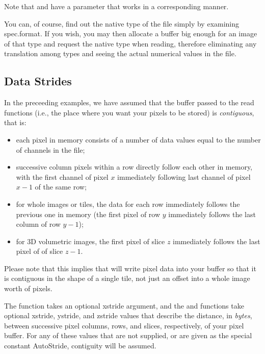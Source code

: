 \noindent Note that \readscanline and \readtile have a parameter that
works in a corresponding manner.

You can, of course, find out the native type of the file simply by
examining {\cf spec.format}.  If you wish, you may then allocate a
buffer big enough for an image of that type and request the native type
when reading, therefore eliminating any translation among types and
seeing the actual numerical values in the file.



\subsection{Data Strides}
\label{sec:imageinput:strides}

In the preceeding examples, we have assumed that the buffer passed to
the {\cf read} functions (i.e., the place where you want your pixels
to be stored) is \emph{contiguous}, that is:

\begin{itemize}
\item each pixel in memory consists of a number of data values equal to
  the number of channels in the file;
\item successive column pixels within a row directly follow each other in
  memory, with the first channel of pixel $x$ immediately following
  last channel of pixel $x-1$ of the same row;
\item for whole images or tiles, the data for each row
  immediately follows the previous one in memory (the first pixel of row
  $y$ immediately follows the last column of row $y-1$);
\item for 3D volumetric images, the first pixel of slice $z$ immediately
  follows the last pixel of of slice $z-1$.
\end{itemize}

Please note that this implies that \readtile will write pixel data into
your buffer so that it is contiguous in the shape of a single tile, not
just an offset into a whole image worth of pixels.

The \readscanline function takes an optional {\cf xstride} argument, and
the \readimage and \readtile functions take optional {\cf xstride}, 
{\cf ystride}, and {\cf zstride} values that describe the distance, in
\emph{bytes}, between successive pixel columns, rows, and slices,
respectively, of your pixel buffer.  For any of these values that are
not supplied, or are given as the special constant {\cf AutoStride},
contiguity will be assumed.

